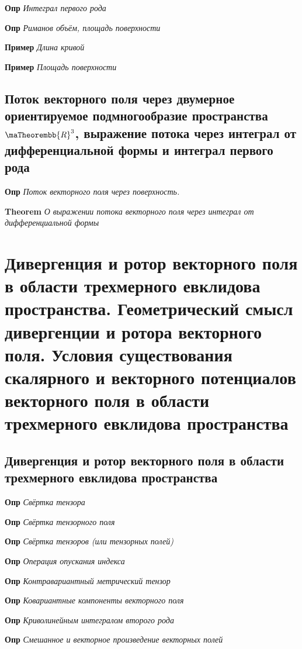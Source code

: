 \documentclass[a4paper, 14pt]{article}
\begin{document}
    \textbf{Опр} \textit{Интеграл первого рода}
    
    \textbf{Опр} \textit{Риманов объём, площадь поверхности}
    
    \textbf{Пример} \textit{Длина кривой}
    
    \textbf{Пример} \textit{Площадь поверхности}
    
    \subsection{Поток векторного поля через двумерное ориентируемое подмногообразие пространства $\maTheorembb{R}^3$,
        выражение потока через интеграл от дифференциальной формы и интеграл первого рода}
    
    \textbf{Опр} \textit{Поток векторного поля через поверхность.}
    
    \textbf{Theorem} \textit{О выражении потока векторного поля через интеграл от дифференциальной формы}
    
    \section{Дивергенция и ротор векторного поля в области трехмерного евклидова пространства.
    Геометрический смысл дивергенции и ротора векторного поля.
    Условия существования скалярного и векторного потенциалов векторного поля в области трехмерного евклидова
    пространства}
    
    \subsection{Дивергенция и ротор векторного поля в области трехмерного евклидова пространства}
    
    \textbf{Опр} \textit{Свёртка тензора}
    
    \textbf{Опр} \textit{Свёртка тензорного поля}
    
    \textbf{Опр} \textit{Свёртка тензоров (или тензорных полей)}
    
    \textbf{Опр} \textit{Операция опускания индекса}
    
    \textbf{Опр} \textit{Контравариантный метрический тензор}
    
    \textbf{Опр} \textit{Ковариантные компоненты векторного поля}
    
    \textbf{Опр} \textit{Криволинейным интегралом второго рода}
    
    \textbf{Опр} \textit{Смешанное и векторное произведение векторных полей}
    
\end{document}
